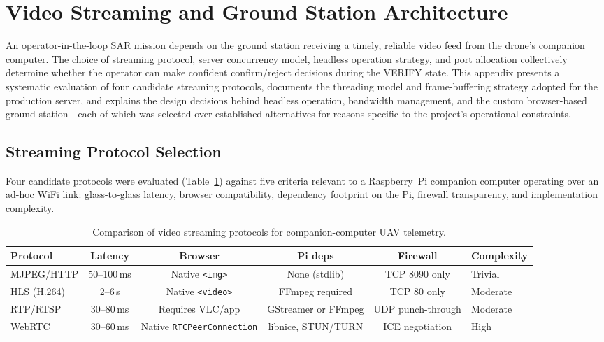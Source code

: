 
\section{Video Streaming and Ground Station Architecture}\label{sec:streaming-arch}

An operator-in-the-loop SAR mission depends on the ground station receiving a timely, reliable video feed from the drone's companion computer.  The choice of streaming protocol, server concurrency model, headless operation strategy, and port allocation collectively determine whether the operator can make confident confirm/reject decisions during the VERIFY state.  This appendix presents a systematic evaluation of four candidate streaming protocols, documents the threading model and frame-buffering strategy adopted for the production server, and explains the design decisions behind headless operation, bandwidth management, and the custom browser-based ground station---each of which was selected over established alternatives for reasons specific to the project's operational constraints.

\subsection{Streaming Protocol Selection}\label{sec:stream-protocol}

Four candidate protocols were evaluated (Table~\ref{tab:stream-protocols}) against five criteria relevant to a
Raspberry~Pi companion computer operating over an ad-hoc WiFi link: glass-to-glass
latency, browser compatibility, dependency footprint on the Pi, firewall
transparency, and implementation complexity.

\begin{table}[ht]
\centering
\caption{Comparison of video streaming protocols for companion-computer UAV telemetry.}
\label{tab:stream-protocols}
\small
\begin{tabular}{@{}lccccl@{}}
\toprule
\textbf{Protocol} & \textbf{Latency} & \textbf{Browser} & \textbf{Pi deps} & \textbf{Firewall} & \textbf{Complexity} \\
\midrule
MJPEG/HTTP        & 50--100\,ms & Native \texttt{<img>} & None (stdlib) & TCP 8090 only & Trivial \\
HLS (H.264)       & 2--6\,s     & Native \texttt{<video>} & FFmpeg required & TCP 80 only & Moderate \\
RTP/RTSP          & 30--80\,ms  & Requires VLC/app & GStreamer or FFmpeg & UDP punch-through & Moderate \\
WebRTC            & 30--60\,ms  & Native \texttt{RTCPeerConnection} & libnice, STUN/TURN & ICE negotiation & High \\
\bottomrule
\end{tabular}
\end{table}


